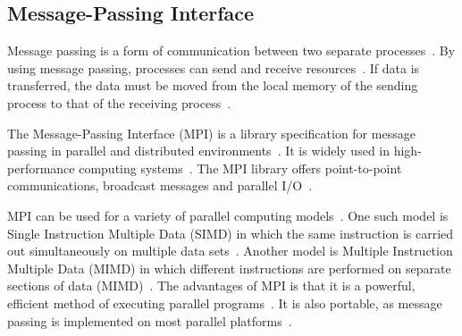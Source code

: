 \documentclass[11pt,twocolumn]{witseiepaper}
\begin{document}
%
\subsection{Message-Passing Interface}
Message passing is a form of communication between two separate processes~\cite{IBM, equijoinWithMPI}. By using message passing, processes can send and receive resources~\cite{IBM}. If data is transferred, the data must be moved from the local memory of the sending process to that of the receiving process~\cite{IBM}.

The Message-Passing Interface (MPI) is a library specification for message passing in parallel and distributed environments~\cite{comparingMPIMapReduce}. It is widely used in high-performance computing systems~\cite{equijoinWithMPI, joinOnCluster}. The MPI library offers point-to-point communications, broadcast messages and parallel I/O~\cite{comparingMPIMapReduce}.

MPI can be used for a variety of parallel computing models~\cite{comparingMPIMapReduce}. One such model is Single Instruction Multiple Data (SIMD) in which the same instruction is carried out simultaneously on multiple data sets~\cite{comparingMPIMapReduce}. Another model is Multiple Instruction Multiple Data (MIMD) in which different instructions are performed on separate sections of data (MIMD)~\cite{comparingMPIMapReduce}. The advantages of MPI is that it is a powerful, efficient method of executing parallel programs~\cite{IBM}. It is also portable, as message passing is implemented on most parallel platforms~\cite{IBM}.
\end{document}
